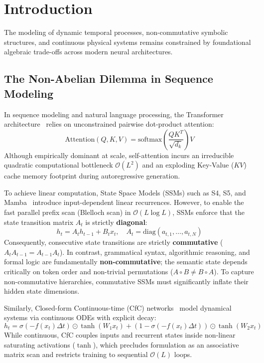 \documentclass[11pt,a4paper]{article}
\begin{document}
\section{Introduction}

The modeling of dynamic temporal processes, non-commutative symbolic structures, and continuous physical systems remains constrained by foundational algebraic trade-offs across modern neural architectures.

\subsection{The Non-Abelian Dilemma in Sequence Modeling}

In sequence modeling and natural language processing, the Transformer architecture~\cite{vaswani2017attention} relies on unconstrained pairwise dot-product attention:
\begin{equation}
    \mathrm{Attention}(Q, K, V) = \mathrm{softmax}\left(\frac{Q K^T}{\sqrt{d_k}}\right) V
\end{equation}
Although empirically dominant at scale, self-attention incurs an irreducible quadratic computational bottleneck $\mathcal{O}(L^2)$ and an exploding Key-Value ($KV$) cache memory footprint during autoregressive generation.

To achieve linear computation, State Space Models (SSMs) such as S4, S5, and Mamba~\cite{gu2023mamba} introduce input-dependent linear recurrences. However, to enable the fast parallel prefix scan (Blelloch scan) in $\mathcal{O}(L \log L)$, SSMs enforce that the state transition matrix $A_t$ is strictly \textbf{diagonal}:
\begin{equation}
    h_t = A_t h_{t-1} + B_t x_t, \quad A_t = \mathrm{diag}(a_{t,1}, \dots, a_{t,N})
\end{equation}
Consequently, consecutive state transitions are strictly \textbf{commutative} ($A_t A_{t-1} = A_{t-1} A_t$). In contrast, grammatical syntax, algorithmic reasoning, and formal logic are fundamentally \textbf{non-commutative}; the semantic state depends critically on token order and non-trivial permutations ($A \circ B \neq B \circ A$). To capture non-commutative hierarchies, commutative SSMs must significantly inflate their hidden state dimensions.

Similarly, Closed-form Continuous-time (CfC) networks~\cite{hasani2022closed} model dynamical systems via continuous ODEs with explicit decay:
\begin{equation}
    h_t = \sigma(-f(x_t) \Delta t) \odot \tanh(W_1 x_t) + (1 - \sigma(-f(x_t) \Delta t)) \odot \tanh(W_2 x_t)
\end{equation}
While continuous, CfC couples inputs and recurrent states inside non-linear saturating activations ($\tanh$), which precludes formulation as an associative matrix scan and restricts training to sequential $\mathcal{O}(L)$ loops.
\end{document}

